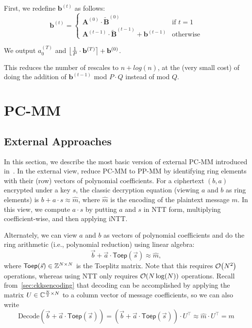 \documentclass[../fheimpl.tex]{subfiles}
\begin{document}
First, we redefine $\mathbf{b}^{(t)}$ as follows:
\[\mathbf{b}^{(t)} = \begin{cases}
	\mathbf{A}^{(0)}\cdot \mathbf{\tilde{B}}^{(0)} & \text{if $t=1$}\\
	\mathbf{A}^{(t-1)}\cdot \mathbf{\tilde{B}}^{(t-1)} + \mathbf{b}^{(t-1)} & \text{otherwise}
\end{cases}\]

We output $a^{(T)}_0$ and $\round*{\frac{1}{P}\cdot \mathbf{b}^{(T)}} + \mathbf{b}^{(0)}$.

This reduces the number of rescales to $n + log(n)$, at the (very small cost) of doing the addition of $\mathbf{b}^{(t-1)}$ mod $P\cdot Q$ instead of mod $Q$.

\section{PC-MM}

\subsection{External Approaches}
In this section, we describe the most basic version of external PC-MM introduced in~\cite{cryptoeprint:2024/1284}. In the external view, reduce PC-MM to PP-MM by identifying ring elements with their (row) vectors of polynomial coefficients. For a ciphertext $(b, a)$ encrypted under a key $s$, the classic decryption equation (viewing $a$ and $b$ as ring elements) is $b+a\cdot s\approx \hat{m}$, where $\hat{m}$ is the encoding of the plaintext message $m$. In this view, we compute $a\cdot s$ by putting $a$ and $s$ in NTT form, multiplying coefficient-wise, and then applying iNTT.

Alternately, we can view $a$ and $b$ as vectors of polynomial coefficients and do the ring arithmetic (i.e., polynomial reduction) using linear algebra:
\[\vec{b} + \vec{a}\cdot\mathsf{Toep}(\vec{s}) \approx \hat{m},\]
where $\mathsf{Toep}(\vec{s})\in\Z^{N\times N}$ is the Toeplitz matrix. Note that this requires $\mathcal{O}\parens*{N^2}$ operations, whereas using NTT only requires $\mathcal{O}\parens*{N\log(N)}$ operations.
Recall from~\cref{sec:ckksencoding} that decoding can be accomplished by applying the matrix $U\in\C^{\frac{N}{2}\times N}$ to a column vector of message coefficients, so we can also write
\[\mathrm{Decode}(\vec{b} + \vec{a}\cdot\mathsf{Toep}(\vec{s})) = (\vec{b} + \vec{a}\cdot\mathsf{Toep}(\vec{s}))\cdot U^\intercal \approx \hat{m}\cdot U^\intercal = m\]
\end{document}
